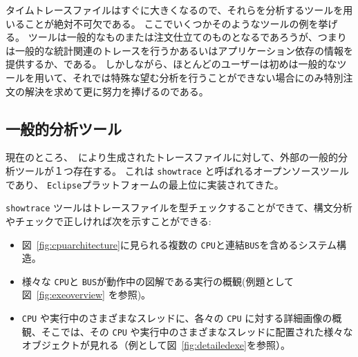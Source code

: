 \documentclass[\pformat,12pt]{jreport}
\begin{document}
タイムトレースファイルはすぐに大きくなるので、それらを分析するツールを用いることが絶対不可欠である。
ここでいくつかそのようなツールの例を挙げる。
ツールは一般的なものまたは注文仕立てのものとなるであろうが、つまりは一般的な統計関連のトレースを行うかあるいはアプリケーション依存の情報を提供するか、である。
しかしながら、ほとんどのユーザーは初めは一般的なツールを用いて、それでは特殊な望む分析を行うことができない場合にのみ特別注文の解決を求めて更に努力を捧げるのである。

\subsection{一般的分析ツール}

現在のところ、\VDMTools\ により生成されたトレースファイルに対して、外部の一般的分析ツールが１つ存在する。
これは \texttt{showtrace} と呼ばれるオープンソースツールであり、 \texttt{Eclipse}プラットフォーム\cite{Carlson05}の最上位に実装されてきた。

 \texttt{showtrace} ツールはトレースファイルを型チェックすることができて、構文分析やチェックで正しければ次を示すことができる:

\begin{itemize}
\item 図~\ref{fig:cpuarchitecture}に見られる複数の \texttt{CPU}と連結\texttt{BUS}を含めるシステム構造。
\item 様々な \texttt{CPU}と \texttt{BUS}が動作中の図解である実行の概観(例題として 図~\ref{fig:exeoverview} を参照)。
\item  \texttt{CPU} や実行中のさまざまなスレッドに、各々の \texttt{CPU} に対する詳細画像の概観、そこでは、その \texttt{CPU} や実行中のさまざまなスレッドに配置された様々なオブジェクトが見れる（例として図~\ref{fig:detailedexe}を参照）。
\end{itemize}
\end{document}
